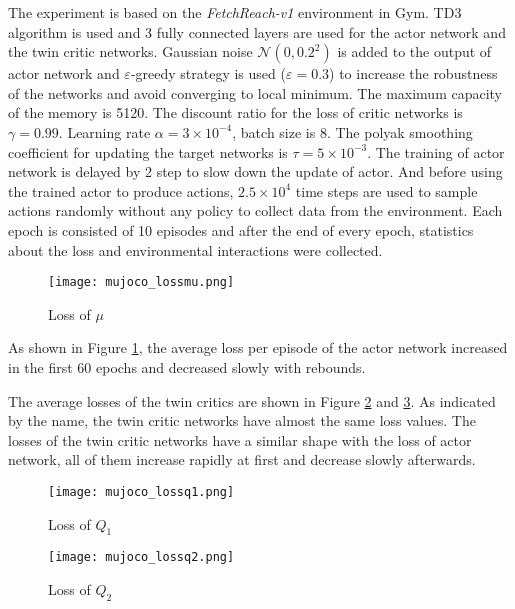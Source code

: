 \documentclass[a4paper, 12pt]{report}
\begin{document}
    The experiment is based on the \emph{FetchReach-v1} environment in Gym. TD3 algorithm is used and 3 fully connected layers are used for the actor network and the twin critic networks. Gaussian noise $\mathcal N(0,0.2^2)$ is added to the output of actor network and $\varepsilon$-greedy strategy is used ($\varepsilon=0.3$) to increase the robustness of the networks and avoid converging to local minimum. The maximum capacity of the memory is 5120. The discount ratio for the loss of critic networks is $\gamma=0.99$. Learning rate $\alpha=3\times 10^{-4}$, batch size is 8. The polyak smoothing coefficient for updating the target networks is $\tau=5\times 10^{-3}$. The training of actor network is delayed by 2 step to slow down the update of actor. And before using the trained actor to produce actions, $2.5\times 10^4$ time steps are used to sample actions randomly without any policy to collect data from the environment. Each epoch is consisted of 10 episodes and after the end of every epoch, statistics about the loss and environmental interactions were collected.

        \begin{figure}[H]
        \centering
        \texttt{[image: mujoco\_lossmu.png]}
        \caption{Loss of $\mu$}
            \label{mujocolossmu}
        \end{figure}

        As shown in Figure \ref{mujocolossmu}, the average loss per episode of the actor network increased in the first 60 epochs and decreased slowly with rebounds. 

        The average losses of the twin critics are shown in Figure \ref{mujocolossq1} and \ref{mujocolossq2}. As indicated by the name, the twin critic networks have almost the same loss values. The losses of the twin critic networks have a similar shape with the loss of actor network, all of them increase rapidly at first and decrease slowly afterwards.

        \begin{figure}[H]
        \centering
        \texttt{[image: mujoco\_lossq1.png]}
        \caption{Loss of $Q_1$}
        \label{mujocolossq1} 
        \end{figure}

        \begin{figure}[H]
        \centering
        \texttt{[image: mujoco\_lossq2.png]}
        \caption{Loss of $Q_2$}
        \label{mujocolossq2} 
        \end{figure}
\end{document}
